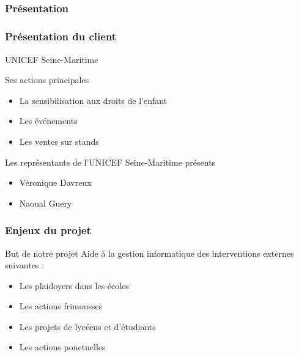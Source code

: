 \subsection{} %

\speaker{\Melissa}
\begin{frame}
\frametitle{Présentation}
	\frametitle{Présentation du client}
	\begin{center}
		UNICEF Seine-Maritime
	\end{center}

	\begin{block}{Ses actions principales}
		\begin{itemize}
			\item La sensibilisation aux droits de l'enfant
			\item Les événements 
			\item Les ventes sur stands
		\end{itemize}
	\end{block}

	\begin{block}{Les représentants de l'UNICEF Seine-Maritime présents}
		\begin{itemize}
			\item Véronique Davreux
			\item Naoual Guery
		\end{itemize}
	\end{block}
\end{frame}

\begin{frame}
\frametitle{Enjeux du projet}
	\begin{block}{But de notre projet}
		Aide à la gestion informatique des interventions externes suivantes :
		\begin{itemize}
			\item Les plaidoyers dans les \'ecoles
			\item Les actions frimousses
			\item Les projets de lycéens et d'étudiants
			\item Les actions ponctuelles
		\end{itemize}
	\end{block}
\end{frame}
